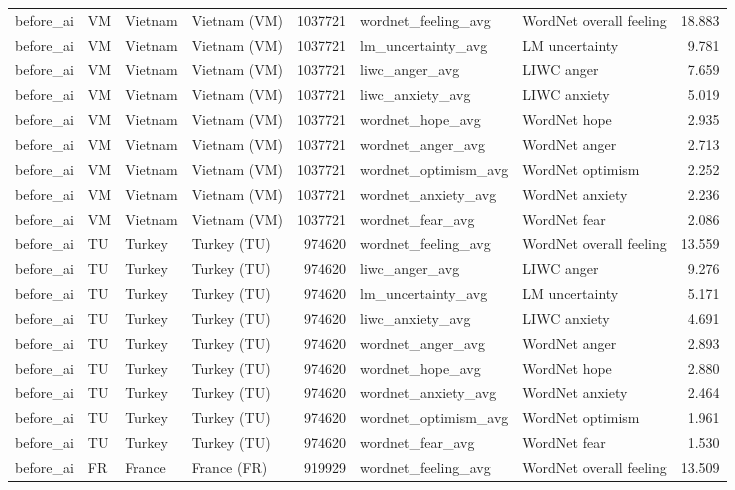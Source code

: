 \begin{tabular}{llllrllr}
before\_ai & VM & Vietnam & Vietnam (VM) & 1037721 & wordnet\_feeling\_avg & WordNet overall feeling & 18.883 \\
before\_ai & VM & Vietnam & Vietnam (VM) & 1037721 & lm\_uncertainty\_avg & LM uncertainty & 9.781 \\
before\_ai & VM & Vietnam & Vietnam (VM) & 1037721 & liwc\_anger\_avg & LIWC anger & 7.659 \\
before\_ai & VM & Vietnam & Vietnam (VM) & 1037721 & liwc\_anxiety\_avg & LIWC anxiety & 5.019 \\
before\_ai & VM & Vietnam & Vietnam (VM) & 1037721 & wordnet\_hope\_avg & WordNet hope & 2.935 \\
before\_ai & VM & Vietnam & Vietnam (VM) & 1037721 & wordnet\_anger\_avg & WordNet anger & 2.713 \\
before\_ai & VM & Vietnam & Vietnam (VM) & 1037721 & wordnet\_optimism\_avg & WordNet optimism & 2.252 \\
before\_ai & VM & Vietnam & Vietnam (VM) & 1037721 & wordnet\_anxiety\_avg & WordNet anxiety & 2.236 \\
before\_ai & VM & Vietnam & Vietnam (VM) & 1037721 & wordnet\_fear\_avg & WordNet fear & 2.086 \\
before\_ai & TU & Turkey & Turkey (TU) & 974620 & wordnet\_feeling\_avg & WordNet overall feeling & 13.559 \\
before\_ai & TU & Turkey & Turkey (TU) & 974620 & liwc\_anger\_avg & LIWC anger & 9.276 \\
before\_ai & TU & Turkey & Turkey (TU) & 974620 & lm\_uncertainty\_avg & LM uncertainty & 5.171 \\
before\_ai & TU & Turkey & Turkey (TU) & 974620 & liwc\_anxiety\_avg & LIWC anxiety & 4.691 \\
before\_ai & TU & Turkey & Turkey (TU) & 974620 & wordnet\_anger\_avg & WordNet anger & 2.893 \\
before\_ai & TU & Turkey & Turkey (TU) & 974620 & wordnet\_hope\_avg & WordNet hope & 2.880 \\
before\_ai & TU & Turkey & Turkey (TU) & 974620 & wordnet\_anxiety\_avg & WordNet anxiety & 2.464 \\
before\_ai & TU & Turkey & Turkey (TU) & 974620 & wordnet\_optimism\_avg & WordNet optimism & 1.961 \\
before\_ai & TU & Turkey & Turkey (TU) & 974620 & wordnet\_fear\_avg & WordNet fear & 1.530 \\
before\_ai & FR & France & France (FR) & 919929 & wordnet\_feeling\_avg & WordNet overall feeling & 13.509 \\

\end{tabular}
